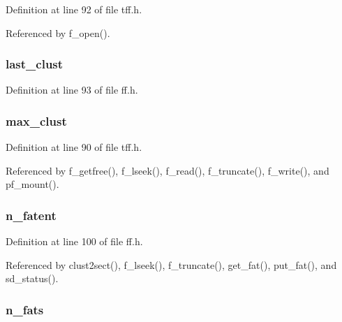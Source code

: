 Definition at line 92 of file tff.\-h.



Referenced by f\-\_\-open().

\hypertarget{struct_f_a_t_f_s_a10cd8b80b3b6474bf0d6432c8fb9d2d2}{
\subsubsection[{last\-\_\-clust}]{ last\-\_\-clust}}\label{struct_f_a_t_f_s_a10cd8b80b3b6474bf0d6432c8fb9d2d2}


Definition at line 93 of file ff.\-h.

\hypertarget{struct_f_a_t_f_s_aa628566fa0882ed951ed01fc6f20ff1b}{
\subsubsection[{max\-\_\-clust}]{ max\-\_\-clust}}\label{struct_f_a_t_f_s_aa628566fa0882ed951ed01fc6f20ff1b}


Definition at line 90 of file tff.\-h.



Referenced by f\-\_\-getfree(), f\-\_\-lseek(), f\-\_\-read(), f\-\_\-truncate(), f\-\_\-write(), and pf\-\_\-mount().

\hypertarget{struct_f_a_t_f_s_a388eb0fa0f3f1449a6ab88c6674e16fc}{
\subsubsection[{n\-\_\-fatent}]{ n\-\_\-fatent}}\label{struct_f_a_t_f_s_a388eb0fa0f3f1449a6ab88c6674e16fc}


Definition at line 100 of file ff.\-h.



Referenced by clust2sect(), f\-\_\-lseek(), f\-\_\-truncate(), get\-\_\-fat(), put\-\_\-fat(), and sd\-\_\-status().

\hypertarget{struct_f_a_t_f_s_ae29a885a8415bb38131a3cddad42fca6}{
\subsubsection[{n\-\_\-fats}]{ n\-\_\-fats}}\label{struct_f_a_t_f_s_ae29a885a8415bb38131a3cddad42fca6}


